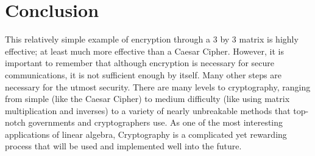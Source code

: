 \documentclass{article}
\begin{document}
\section{Conclusion}
This relatively simple example of encryption through a 3 by 3 matrix is highly effective; at least much more effective than a Caesar Cipher. However, it is important to remember that although encryption is necessary for secure communications, it is not sufficient enough by itself. Many other steps are necessary for the utmost security. There are many levels to cryptography, ranging from simple (like the Caesar Cipher) to medium difficulty (like using matrix multiplication and inverses) to a variety of nearly unbreakable methods that top-notch governments and cryptographers use. As one of the most interesting applications of linear algebra, Cryptography is a complicated yet rewarding process that will be used and implemented well into the future. \\

\newpage


\end{document}
